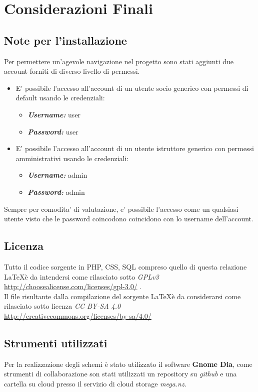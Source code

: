 \chapter{Considerazioni Finali} 

\section{Note per l'installazione}

Per permettere un'agevole navigazione nel progetto sono stati aggiunti due account forniti di diverso livello di permessi. \\
\begin{itemize}
\item E' possibile l'accesso all'account  di un utente socio generico con permessi di default usando le credenziali:
\begin{itemize}
\item \textbf{\textit{Username:}} user
\item \textbf{\textit{Password:}} user
\end{itemize} 

\item E' possibile l'accesso all'account di un utente istruttore generico con permessi \\ amministrativi usando le credenziali:
\begin{itemize}
\item \textbf{\textit{Username:}} admin
\item \textbf{\textit{Password:}} admin
\end{itemize} 
\end{itemize}

Sempre per comodita' di valutazione, e' possibile l'accesso come un qualsiasi utente visto che le password coincodono coincidono con lo username dell'account.

\section{Licenza}
Tutto il codice sorgente in PHP, CSS, SQL compreso quello di questa relazione \LaTeX  è da intendersi come rilasciato sotto \textit{GPLv3}\\
\url{http://choosealicense.com/licenses/gpl-3.0/} 
 . \\ Il file risultante dalla compilazione del sorgente \LaTeX è da considerarsi come rilasciato sotto licenza \textit{CC BY-SA 4.0}\\ \url{http://creativecommons.org/licenses/by-sa/4.0/} 

\section{Strumenti utilizzati}
Per la realizzazione degli schemi è stato utilizzato il software \textbf{Gnome Dia}, come strumenti di collaborazione son stati utilizzati un repository su \textit{github} e una cartella su cloud presso il servizio di cloud storage \textit{mega.nz}.